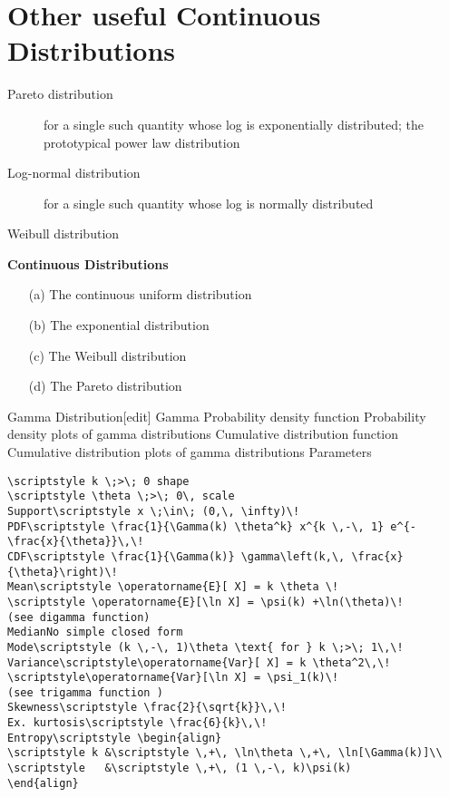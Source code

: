 

\section{Other useful Continuous Distributions}
\begin{description}
\item [Pareto distribution] for a single such quantity whose log is exponentially distributed; 
the prototypical power law distribution
\item [Log-normal distribution] for a single such quantity whose log is normally distributed
\item [Weibull distribution]
\end{description}




\noindent \textbf{ Continuous Distributions}
\begin{multicols}{2}
\begin{itemize}
\item[(a)] The continuous uniform distribution
\item[(b)] The exponential distribution
\item[(c)] The Weibull distribution
\item[(d)] The Pareto distribution
\end{itemize}
\end{multicols}






Gamma Distribution[edit]
Gamma
Probability density function
Probability density plots of gamma distributions
Cumulative distribution function
Cumulative distribution plots of gamma distributions
Parameters

\begin{verbatim}
\scriptstyle k \;>\; 0 shape
\scriptstyle \theta \;>\; 0\, scale
Support\scriptstyle x \;\in\; (0,\, \infty)\!
PDF\scriptstyle \frac{1}{\Gamma(k) \theta^k} x^{k \,-\, 1} e^{-\frac{x}{\theta}}\,\!
CDF\scriptstyle \frac{1}{\Gamma(k)} \gamma\left(k,\, \frac{x}{\theta}\right)\!
Mean\scriptstyle \operatorname{E}[ X] = k \theta \!
\scriptstyle \operatorname{E}[\ln X] = \psi(k) +\ln(\theta)\!
(see digamma function)
MedianNo simple closed form
Mode\scriptstyle (k \,-\, 1)\theta \text{ for } k \;>\; 1\,\!
Variance\scriptstyle\operatorname{Var}[ X] = k \theta^2\,\!
\scriptstyle\operatorname{Var}[\ln X] = \psi_1(k)\!
(see trigamma function )
Skewness\scriptstyle \frac{2}{\sqrt{k}}\,\!
Ex. kurtosis\scriptstyle \frac{6}{k}\,\!
Entropy\scriptstyle \begin{align}
\scriptstyle k &\scriptstyle \,+\, \ln\theta \,+\, \ln[\Gamma(k)]\\
\scriptstyle   &\scriptstyle \,+\, (1 \,-\, k)\psi(k)
\end{align}
\end{verbatim}




